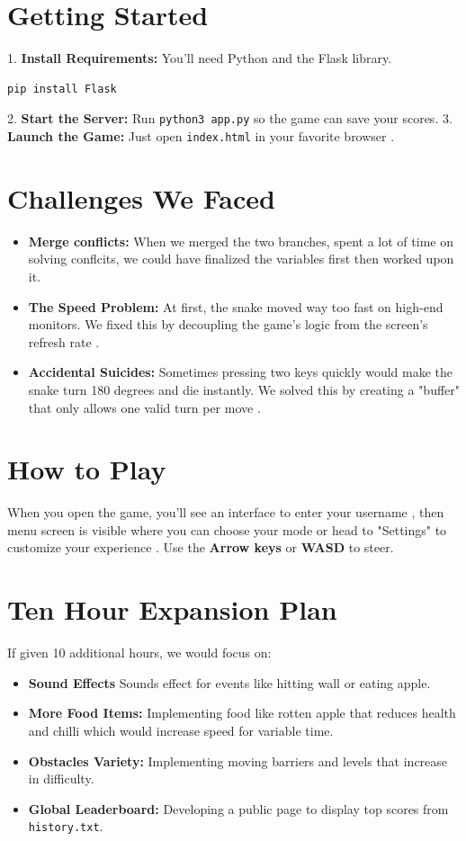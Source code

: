 \section{Getting Started}
1. \textbf{Install Requirements:} You'll need Python and the Flask library.
\begin{lstlisting} 
pip install Flask  
\end{lstlisting}
2. \textbf{Start the Server:} Run \texttt{python3 app.py} so the game can save your scores.
3. \textbf{Launch the Game:} Just open \texttt{index.html} in your favorite browser .

\section{Challenges We Faced}
\begin{itemize}
    \item \textbf{Merge conflicts: } When we merged the two branches, spent a lot of time on solving conflcits, we could have finalized the variables first then worked upon it. 
    \item \textbf{The Speed Problem:} At first, the snake moved way too fast on high-end monitors. We fixed this by decoupling the game's logic from the screen's refresh rate .
    \item \textbf{Accidental Suicides:} Sometimes pressing two keys quickly would make the snake turn 180 degrees and die instantly. We solved this by creating a "buffer" that only allows one valid turn per move .
\end{itemize}

\section{How to Play}
When you open the game, you'll see an interface to  enter your username , then menu screen is visible where you can choose your mode or head to "Settings" to customize your experience . Use the \textbf{Arrow keys} or \textbf{WASD} to steer.  

\section{Ten Hour Expansion Plan}
If given 10 additional hours, we would focus on:
\begin{itemize}
    \item \textbf{Sound Effects} Sounds effect for events like hitting wall or eating apple.
    \item \textbf{  More Food Items:} Implementing food like rotten apple that reduces health and chilli which would increase speed for variable time.
    \item \textbf{  Obstacles Variety:} Implementing moving barriers and levels that increase in difficulty.
    \item \textbf{Global Leaderboard:} Developing a public page to display top scores from \texttt{history.txt}.
\end{itemize}
\nocite{*}
\printbibliography
